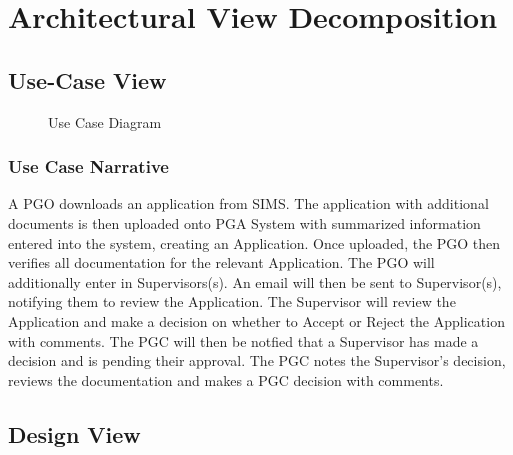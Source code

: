 \documentclass[11pt]{article}
\begin{document}
\section{Architectural View Decomposition}
\subsection{Use-Case View}
\begin{figure}[H]
	\caption{Use Case Diagram}
\end{figure}
\subsubsection{Use Case Narrative}
A PGO downloads an application from SIMS. The application with additional documents is then uploaded onto PGA System with summarized information entered into the system, creating an Application. Once uploaded,
the PGO then verifies all documentation for the relevant Application.
The PGO will additionally enter in Supervisors(s). An email will then be sent
to Supervisor(s), notifying them to review the Application. The Supervisor will
review the Application and make a decision on whether to Accept or Reject the
Application with comments. The PGC will then be notfied that a Supervisor
has made a decision and is pending their approval. The PGC notes the Supervisor’s
decision, reviews the documentation and makes a PGC decision with comments. 
\subsection{Design View}
\end{document}
